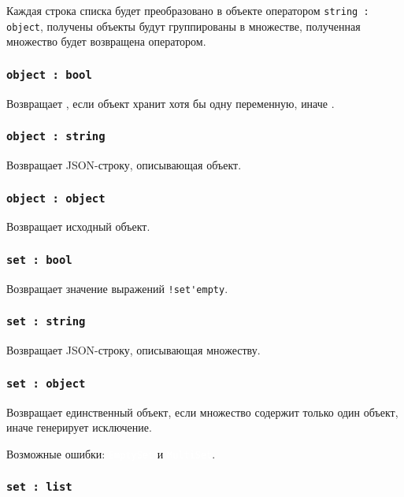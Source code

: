 \documentclass[a4paper, 14pt]{extarticle}
\newcommand{\ferror}[1]{{\fontsize{11pt}{12pt} \tt \colorbox{function}{\textcolor{white}{#1}}}}
\begin{document}
Каждая строка списка будет преобразовано в объекте оператором \lstinline|string : object|, получены объекты будут группированы в множестве, полученная множество будет возвращена оператором.

\subsubsection{\lstinline|object : bool|}

Возвращает \true, если объект хранит хотя бы одну переменную, иначе \false.

\subsubsection{\lstinline|object : string|}

Возвращает JSON-строку, описывающая объект.

\subsubsection{\lstinline|object : object|}

Возвращает исходный объект.

\subsubsection{\lstinline|set : bool|}

Возвращает значение выражений \lstinline|!set'empty|.

\subsubsection{\lstinline|set : string|}

Возвращает JSON-строку, описывающая множеству.

\subsubsection{\lstinline|set : object|}

Возвращает единственный объект, если множество содержит только один объект, иначе генерирует исключение.

Возможные ошибки: \ferror{EmptySet} и \ferror{MultiSet}.

\subsubsection{\lstinline|set : list|}
\end{document}
